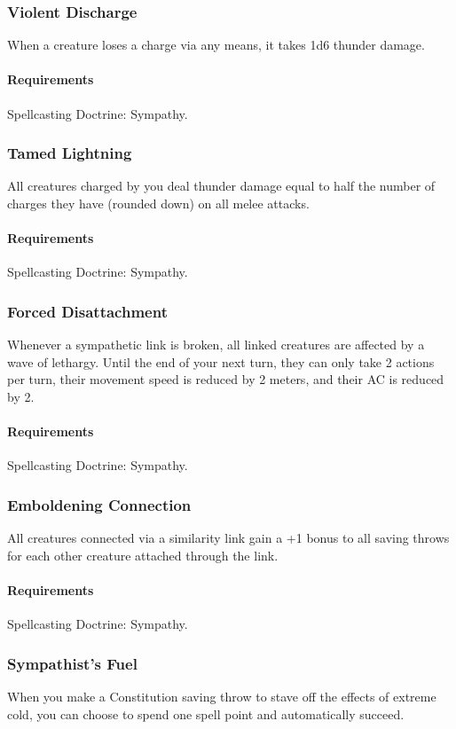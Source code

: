\subsubsection{Violent Discharge} \label{feat::violentdischarge}
    When a creature loses a charge via any means, it takes 1d6 thunder damage.
    \paragraph{Requirements} Spellcasting Doctrine: Sympathy.
\subsubsection{Tamed Lightning} \label{feat::tamedlightning}
    All creatures charged by you deal thunder damage equal to half the number of charges they have (rounded down) on all melee attacks.
    \paragraph{Requirements} Spellcasting Doctrine: Sympathy.
\subsubsection{Forced Disattachment} \label{feat::forceddisattachment}
    Whenever a sympathetic link is broken, all linked creatures are affected by a wave of lethargy.
    Until the end of your next turn, they can only take 2 actions per turn, their movement speed is reduced by 2 meters, and their AC is reduced by 2.
    \paragraph{Requirements} Spellcasting Doctrine: Sympathy.
\subsubsection{Emboldening Connection} \label{feat::emboldeningconnection}
    All creatures connected via a similarity link gain a +1 bonus to all saving throws for each other creature attached through the link.
    \paragraph{Requirements} Spellcasting Doctrine: Sympathy.

\subsubsection{Sympathist's Fuel} \label{feat::sympathistsfuel}
    When you make a Constitution saving throw to stave off the effects of extreme cold, you can choose to spend one spell point and automatically succeed.

